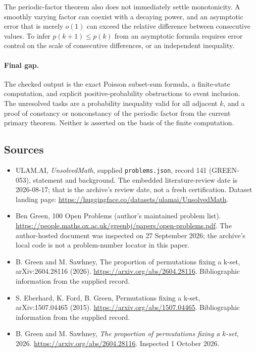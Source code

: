 \documentclass[11pt,a4paper]{article}
\begin{document}
The periodic-factor theorem also does not immediately settle monotonicity. A smoothly varying factor can coexist with a decaying power, and an asymptotic error that is merely $o(1)$ can exceed the relative difference between consecutive values. To infer $p(k+1)\leq p(k)$ from an asymptotic formula requires error control on the scale of consecutive differences, or an independent inequality.

\paragraph{Final gap.}
The checked output is the exact Poisson subset-sum formula, a finite-state computation, and explicit positive-probability obstructions to event inclusion. The unresolved tasks are a probability inequality valid for all adjacent $k$, and a proof of constancy or nonconstancy of the periodic factor from the current primary theorem. Neither is asserted on the basis of the finite computation.

\subsection{Sources}

{\small

\begin{itemize}

\item[\hypertarget{source:141:1}{S1}] ULAM.AI, \emph{UnsolvedMath}, supplied \texttt{problems.json}, record 141 (GREEN-053), statement and background. The embedded literature-review date is 2026-08-17; that is the archive’s review date, not a fresh certification. Dataset landing page: \url{https://huggingface.co/datasets/ulamai/UnsolvedMath}.

\item[\hypertarget{source:141:2}{S2}] Ben Green, 100 Open Problems (author’s maintained problem list). \url{https://people.maths.ox.ac.uk/greenbj/papers/open-problems.pdf}. The author-hosted document was inspected on 27 September 2026; the archive’s local code is not a problem-number locator in this paper.

\item[\hypertarget{source:141:3}{S3}] B. Green and M. Sawhney, The proportion of permutations fixing a k-set, arXiv:2604.28116 (2026). \url{https://arxiv.org/abs/2604.28116}. Bibliographic information from the supplied record.

\item[\hypertarget{source:141:4}{S4}] S. Eberhard, K. Ford, B. Green, Permutations fixing a k-set, arXiv:1507.04465 (2015). \url{https://arxiv.org/abs/1507.04465}. Bibliographic information from the supplied record.

\item[E1] B. Green and M. Sawhney, \emph{The proportion of permutations fixing a $k$-set}, 2026. \url{https://arxiv.org/abs/2604.28116}. Inspected 1 October 2026.

\end{itemize}

}

\label{end:141}
\end{document}
